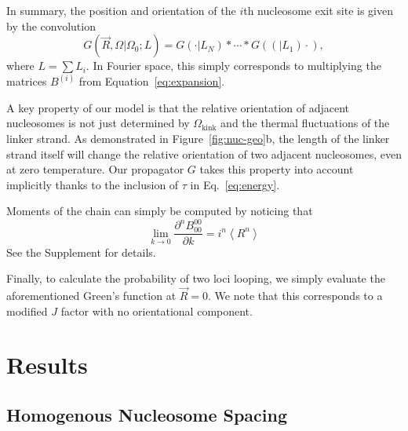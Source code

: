 \documentclass[%
 reprint,
superscriptaddress,
showpacs,preprintnumbers,
 amsmath,amssymb,
 aps,
 prl,
]{revtex4-1}
\newcommand{\greens}[2][\Omega_0; L]{G(#2|#1)}
\begin{document}
In summary, the position and orientation of the $i$th nucleosome exit site
    is given by the convolution
\begin{equation}\label{eq:conv}
    \greens{\vec{R}, \Omega} = \greens[L_N]{\cdot} * \cdots{} *
    \greens[L_1](\cdot),
\end{equation}
where $L = \sum L_i$.
In Fourier space, this simply corresponds to multiplying the matrices $B^{(i)}$
    from Equation~\ref{eq:expansion}.

A key property of our model is that the relative orientation of adjacent
    nucleosomes is not just determined by $\Omega_\text{kink}$ and the thermal
    fluctuations of the linker strand.
As demonstrated in Figure~\ref{fig:nuc-geo}b, the length of the linker strand
    itself will change the relative orientation of two adjacent nucleosomes,
    even at zero temperature.
Our propagator $G$ takes this property into account implicitly thanks to the
    inclusion of $\tau$ in Eq.~\ref{eq:energy}.

Moments of the chain can simply be computed by noticing that
\begin{equation}\label{eq:moments}
    \lim_{k\to0} \frac{\partial^n B_{00}^{00}}{\partial k} = i^n \left\langle
    R^n\right\rangle
\end{equation}
See the Supplement for details.

Finally, to calculate the probability of two loci looping, we simply evaluate
    the aforementioned Green's function at $\vec{R} = 0$.
We note that this corresponds to a modified $J$ factor with no orientational
    component.


\section{\label{sec:model}Results}
\subsection{\label{sec:homo-kuhn}Homogenous Nucleosome Spacing}
\end{document}
